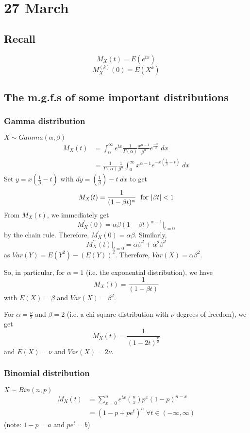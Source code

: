\documentclass[12pt]{article}
\begin{document}
\section{27 March}
\subsection{Recall}
\[
    M_X (t) = E(e^{tx})
\]
\[
    M_X^{(k)} (0) = E(X^k)
\]
\subsection{The m.g.f.s of some important distributions}
\subsubsection{Gamma distribution}
$X \sim Gamma(\alpha,\beta)$
\begin{align*}
    M_X (t) &= \int_0^{\infty} e^{tx} \frac{1}{\Gamma(\alpha)} \frac{x^{\alpha -1}}{\beta^{\alpha}} e^{\frac{-x}{\beta}} \; dx \\
        &= \frac{1}{\Gamma(\alpha)} \frac{1}{\beta^{\alpha}} \int_0^{\infty} x^{\alpha - 1} e^{-x ( \frac{1}{\beta} - t)} \; dx 
\end{align*}
Set $y = x(\frac{1}{\beta} - t)$ with $dy = (\frac{1}{\beta}) - t \; dx$ to get
\[
    M_X (t) = \frac{1}{(1-\beta t)^{\alpha}} \; \textnormal{ for } |\beta t| < 1 
\]
From $M_X (t)$, we immediately get
\[
    M_X^{\prime} (0) = \alpha \beta (1 - \beta t)^{\alpha - 1} \Big|_{t=0}
\]
by the chain rule. Therefore, $M_X^{\prime} (0) = \alpha \beta$. Similarly,
\[
    M_X^{\prime \prime} (t) \Big|_{t=0} = \alpha \beta^2 + \alpha^2 \beta^2
\]
as $Var(Y) = E(Y^2) - (E(Y))^2$. Therefore, $Var(X) = \alpha \beta^2$.

So, in particular, for $\alpha = 1$ (i.e. the exponential distribution), we have
\[
    M_X (t) = \frac{1}{(1-\beta t)}
\]
with $E(X) = \beta$ and $Var(X) = \beta^2$. 

For $\alpha = \frac{\nu}{2}$ and $\beta = 2$ (i.e. a chi-square distribution with $\nu$ degrees of freedom), we get
\[
    M_X (t) = \frac{1}{(1-2t)^{\frac{\nu}{2}}}
\]
and $E(X) = \nu$ and $Var(X) = 2 \nu$.

\subsubsection{Binomial distribution}
$X \sim Bin(n,p)$
\begin{align*}
    M_X (t) &= \sum_{x=0}^n e^{tx} {n \choose x} p^x (1-p)^{n-x} \\
        &= (1 - p + pe^t)^n \; \forall t \in (-\infty, \infty)
\end{align*}
(note: $1-p = a$ and $pe^t = b$)
\end{document}
